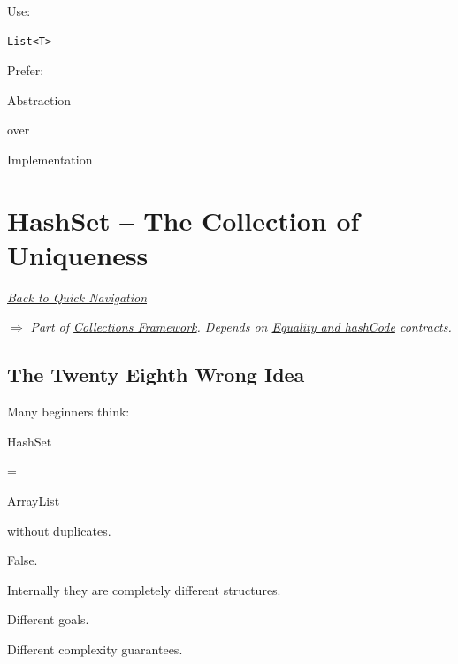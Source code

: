 \documentclass[11pt,a4paper]{book}
\begin{document}
Use:

\begin{verbatim} 
List<T>
\end{verbatim}


Prefer:


Abstraction


over


Implementation
\chapter{HashSet -- The Collection of Uniqueness}

\smallskip
\noindent
\hyperref[sec:quick_nav]{\emph{Back to Quick Navigation}}

\smallskip
\noindent
\textcolor{RosettaRoyalPurple}{$\Rightarrow$}
\emph{Part of \hyperref[chap:collections]{Collections Framework}. Depends on \hyperref[chap:objects_identity]{Equality and hashCode} contracts.}


\section{The Twenty Eighth Wrong Idea}

\begin{trap}

Many beginners think:


HashSet

=

ArrayList

without duplicates.


False.


Internally they are completely
different structures.


Different goals.


Different complexity guarantees.

\end{trap}
\end{document}
